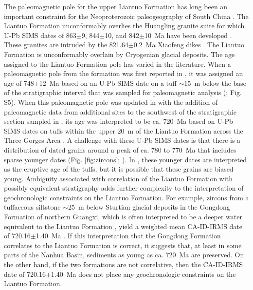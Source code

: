 The paleomagnetic pole for the upper Liantuo Formation has long been an important constraint for the Neoproterozoic paleogeography of South China \citep{Evans2000a}. The Liantuo Formation unconformably overlies the Huangling granite suite for which U-Pb SIMS dates of 863$\pm$9, 844$\pm$10, and 842$\pm$10~Ma have been developed \citep{Wei2012a}. These granites are intruded by the 821.64$\pm$0.2~Ma Xiaofeng dikes \citep{Wang2016b}. The Liantuo Formation is unconformably overlain by Cryogenian glacial deposits. The age assigned to the Liantuo Formation pole has varied in the literature. When a paleomagnetic pole from the formation was first reported in \citet{Evans2000a}, it was assigned an age of 748$\pm$12~Ma based on an U-Pb SIMS date on a tuff $\sim$15~m below the base of the stratigraphic interval that was sampled for paleomagnetic analysis (\citealp{Ma1984a}; Fig. S5). When this paleomagnetic pole was updated in \citet{Jing2015a} with the addition of paleomagnetic data from additional sites to the southwest of the stratigraphic section sampled in \citet{Evans2000a}, its age was interpreted to be ca. 720~Ma based on U-Pb SIMS dates on tuffs within the upper 20~m of the Liantuo Formation across the Three Gorges Area \citep{Lan2015a}. A challenge with these U-Pb SIMS dates is that there is a distribution of dated grains around a peak of ca. 780 to 770~Ma that includes sparse younger dates (Fig. \ref{fig:zircons}; \citealp{Lan2015a}). In \citet{Lan2015a}, these younger dates are interpreted as the eruptive age of the tuffs, but it is possible that these grains are biased young. Ambiguity associated with correlation of the Liantuo Formation with possibly equivalent stratigraphy adds further complexity to the interpretation of geochronologic constraints on the Liantuo Formation. For example, zircons from a tuffaceous siltstone $\sim$25~m below Sturtian glacial deposits in the Gongdong Formation of northern Guangxi, which is often interpreted to be a deeper water equivalent to the Liantuo Formation \citep{Wang2003a, Pi2016a}, yield a weighted mean CA-ID-IRMS date of 720.16$\pm$1.40~Ma \citep{Lan2020a}. If this interpretation that the Gongdong Formation correlates to the Liantuo Formation is correct, it suggests that, at least in some parts of the Nanhua Basin, sediments as young as ca. 720~Ma are preserved. On the other hand, if the two formations are not correlative, then the CA-ID-IRMS date of 720.16$\pm$1.40~Ma \citep{Lan2020a} does not place any geochronologic constraints on the Liantuo Formation.


